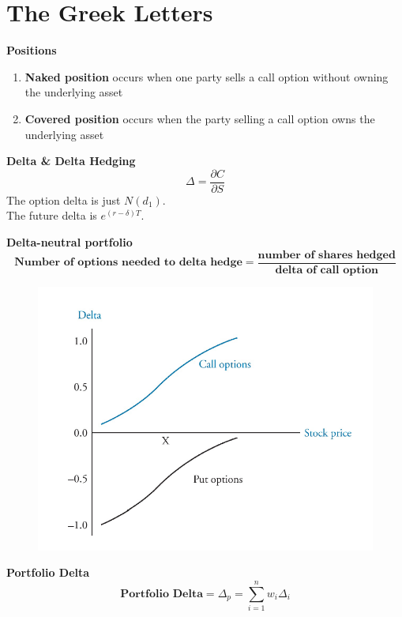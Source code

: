\documentclass[11pt,fleqn]{book} %
\numberwithin{equation}{section} %
\numberwithin{figure}{section} %
\numberwithin{table}{section} %
\begin{document}
\chapter{The Greek Letters}
\begin{definition}\textbf{Positions}\\
\begin{enumerate}
    \item \textbf{Naked position} occurs when one party sells a call option without owning the underlying asset
    \item \textbf{Covered position} occurs when the party selling a call option owns the underlying asset
\end{enumerate}
\end{definition}
\begin{definition}\textbf{Delta \& Delta Hedging}\\
$$
\Delta=\frac{\partial C}{\partial S}
$$
The option delta is just $N(d_1)$.\\
The future delta is $e^{(r-\delta)T}$.
\end{definition}
\begin{definition}\textbf{Delta-neutral portfolio}\\
$$
\textbf{Number of options needed to delta hedge}=\frac{\textbf{number of shares hedged}}{\textbf{delta of call option}}
$$
\end{definition}
\begin{figure}[h!]
    \centering
    \includegraphics[scale=1]{delta.PNG}
\end{figure}
\begin{definition}\textbf{Portfolio Delta}\\
$$
\textbf{Portfolio Delta}=\Delta_p=\sum_{i=1}^nw_i\Delta_i
$$
\end{definition}
\end{document}
